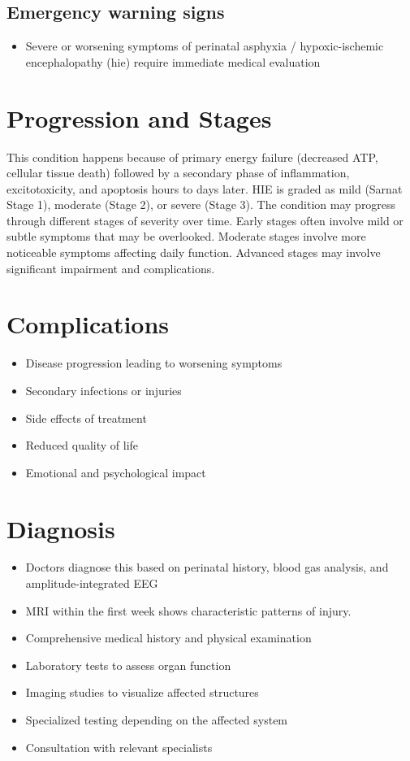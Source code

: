 \subsection{Emergency warning signs}
\begin{itemize}[noitemsep]
  \item Severe or worsening symptoms of perinatal asphyxia / hypoxic-ischemic encephalopathy (hie) require immediate medical evaluation
\end{itemize}
\section{Progression and Stages}
This condition happens because of primary energy failure (decreased ATP, cellular tissue death) followed by a secondary phase of inflammation, excitotoxicity, and apoptosis hours to days later. HIE is graded as mild (Sarnat Stage 1), moderate (Stage 2), or severe (Stage 3). The condition may progress through different stages of severity over time. Early stages often involve mild or subtle symptoms that may be overlooked. Moderate stages involve more noticeable symptoms affecting daily function. Advanced stages may involve significant impairment and complications.
\section{Complications}
\begin{itemize}[noitemsep]
  \item Disease progression leading to worsening symptoms
  \item Secondary infections or injuries
  \item Side effects of treatment
  \item Reduced quality of life
  \item Emotional and psychological impact
\end{itemize}
\section{Diagnosis}
\begin{itemize}[noitemsep]
  \item Doctors diagnose this based on perinatal history, blood gas analysis, and amplitude-integrated EEG
  \item MRI within the first week shows characteristic patterns of injury.
  \item Comprehensive medical history and physical examination
  \item Laboratory tests to assess organ function
  \item Imaging studies to visualize affected structures
  \item Specialized testing depending on the affected system
  \item Consultation with relevant specialists
\end{itemize}
